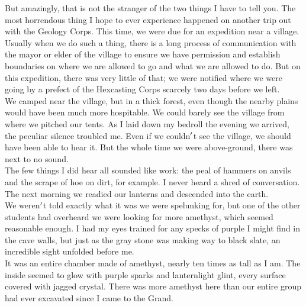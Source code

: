 \documentclass[12pt]{article}
\begin{document}
  
    But amazingly, that is not the stranger of the two things I have to tell you. The most horrendous thing I hope to ever experience happened on another trip out with the Geology Corps. This time, we were due for an expedition near a village.\\


  
    Usually when we do such a thing, there is a long process of communication with the mayor or elder of the village to ensure we have permission and establish boundaries on where we are allowed to go and what we are allowed to do. But on this expedition, there was very little of that; we were notified where we were going by a prefect of the Hexcasting Corps scarcely two days before we left.\\


  
    We camped near the village, but in a thick forest, even though the nearby plains would have been much more hospitable. We could barely see the village from where we pitched our tents. As I laid down my bedroll the evening we arrived, the peculiar silence troubled me. Even if we couldn$\rq$t see the village, we should have been able to hear it. But the whole time we were above-ground, there was next to no sound.\\


  
    The few things I did hear all sounded like work: the peal of hammers on anvils and the scrape of hoe on dirt, for example. I never heard a shred of conversation.\\The next morning we readied our lanterns and descended into the earth.\\


  
    We weren$\rq$t told exactly what it was we were spelunking for, but one of the other students had overheard we were looking for more amethyst, which seemed reasonable enough. I had my eyes trained for any specks of purple I might find in the cave walls, but just as the gray stone was making way to black slate, an incredible sight unfolded before me.\\It was an entire chamber made of amethyst, nearly ten times as tall as I am. The inside seemed to glow with purple sparks and lanternlight glint, every surface covered with jagged crystal. There was more amethyst here than our entire group had ever excavated since I came to the Grand.\\
\end{document}
